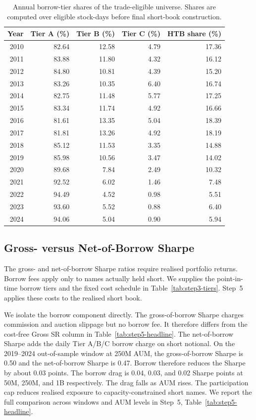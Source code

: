 \documentclass[12pt]{article}
\begin{document}
\begin{table}[H]
\centering
\caption{Annual borrow-tier shares of the trade-eligible universe. Shares are
computed over eligible stock-days before final short-book construction.}
\label{tab:stage3-tier-yearly}
\begin{tabular}{rrrrr}
\toprule
Year & Tier A (\%) & Tier B (\%) & Tier C (\%) & HTB share (\%) \\
\midrule
2010 & 82.64 & 12.58 & 4.79 & 17.36 \\
2011 & 83.88 & 11.80 & 4.32 & 16.12 \\
2012 & 84.80 & 10.81 & 4.39 & 15.20 \\
2013 & 83.26 & 10.35 & 6.40 & 16.74 \\
2014 & 82.75 & 11.48 & 5.77 & 17.25 \\
2015 & 83.34 & 11.74 & 4.92 & 16.66 \\
2016 & 81.61 & 13.35 & 5.04 & 18.39 \\
2017 & 81.81 & 13.26 & 4.92 & 18.19 \\
2018 & 85.12 & 11.53 & 3.35 & 14.88 \\
2019 & 85.98 & 10.56 & 3.47 & 14.02 \\
2020 & 89.68 & 7.84 & 2.49 & 10.32 \\
2021 & 92.52 & 6.02 & 1.46 & 7.48 \\
2022 & 94.49 & 4.52 & 0.98 & 5.51 \\
2023 & 93.60 & 5.52 & 0.88 & 6.40 \\
2024 & 94.06 & 5.04 & 0.90 & 5.94 \\
\bottomrule
\end{tabular}
\end{table}



\subsection{Gross- versus Net-of-Borrow Sharpe}

The gross- and net-of-borrow Sharpe ratios require realised portfolio returns. Borrow fees apply only to names actually held short. We supplies the
point-in-time borrow tiers and the fixed cost schedule in
Table~\ref{tab:step3-tiers}. Step~5 applies these costs to the realised short book.

We isolate the borrow component directly. The gross-of-borrow Sharpe charges commission and auction slippage but no borrow fee. It therefore differs from the
cost-free Gross SR column in Table~\ref{tab:step5-headline}. The net-of-borrow Sharpe adds the daily Tier A/B/C borrow charge on short notional. On the
2019--2024 out-of-sample window at 250M AUM, the gross-of-borrow Sharpe is 0.50 and the net-of-borrow Sharpe is 0.47. Borrow therefore reduces the Sharpe by about 0.03 points. The borrow drag is 0.04, 0.03, and 0.02 Sharpe points at 50M, 250M, and 1B respectively. The drag falls as AUM rises. The participation cap reduces
realised exposure to capacity-constrained short names. We report the full comparison across windows and AUM levels in Step~5, Table~\ref{tab:step5-headline}.
\end{document}
